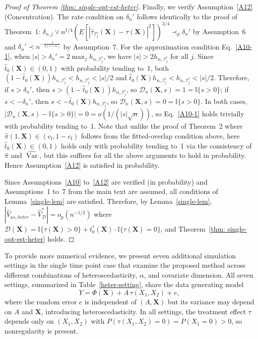 \documentclass[11pt]{article}
\theoremstyle{referenceplain}
\theoremstyle{referencedefinition}
\theoremstyle{referenceremark}
\begin{document}
\begin{proof}[Proof of Theorem \ref{thm: single-opt-est-heter}]
    Finally, we verify Assumption~\ref{A12} 
    (Concentration). The rate condition on $\delta_n'$ 
    follows identically to the proof of Theorem~1: 
    ${\delta_{n,j}}\lor n^{1/4}(E[|\widehat{\tau}_{{\mathcal{I}_j^c}}
    (\mathbf{X})-\tau(\mathbf{X})|^2])^{3/4}
    \prec_p\delta_n'$ by Assumption~6 and 
    $\delta_n'\prec n^{-\frac{1}{2(1+\alpha)}}$ by 
    Assumption~7. For the approximation condition 
    Eq.~\eqref{A10-1}, when 
    $|s|>\delta_n'=2\max_j h_{n,\mathcal{I}_j^c}$, 
    we have $|s|>2h_{n,\mathcal{I}_j^c}$ for all $j$. 
    Since $\widehat{t}_0(\mathbf{X})\in(0,1)$ with 
    probability tending to~1, both 
    $(1-\widehat{t}_0(\mathbf{X}))
    h_{n,\mathcal{I}_j^c}
    <h_{n,\mathcal{I}_j^c}<|s|/2$ and 
    $\widehat{t}_0(\mathbf{X})
    h_{n,\mathcal{I}_j^c}
    <h_{n,\mathcal{I}_j^c}<|s|/2$. Therefore, if 
    $s>\delta_n'$, then 
    $s>(1-\widehat{t}_0(\mathbf{X}))
    h_{n,\mathcal{I}_j^c}$, so 
    $\mathcal{D}_n(\mathbf{X},s)=1
    =\mathbb{I}\{s>0\}$; if $s<-\delta_n'$, then 
    $s<-\widehat{t}_0(\mathbf{X})
    h_{n,\mathcal{I}_j^c}$, so 
    $\mathcal{D}_n(\mathbf{X},s)=0
    =\mathbb{I}\{s>0\}$. In both cases, 
    $|\mathcal{D}_n(\mathbf{X},s)
    -\mathbb{I}\{s>0\}|=0=o(1/({|s|}\sqrt{n}))$, 
    so Eq.~\eqref{A10-1} holds trivially with 
    probability tending to~1. Note that unlike the 
    proof of Theorem~2 where 
    {$\widehat{\pi}(1,\mathbf{X})\in(c_{\mathrm f},1-c_{\mathrm f})$ follows from the fitted-overlap condition above}, here 
    $\widehat{t}_0(\mathbf{X})\in(0,1)$ holds only 
    with probability tending to~1 via the consistency 
    of $\widehat{\pi}$ and 
    $\widehat{\operatorname{Var}}$, but this suffices 
    for all the above arguments to hold in probability. 
    Hence Assumption~\ref{A12} is satisfied in 
    probability.

    Since Assumptions~\ref{A10} to~\ref{A12} are 
    verified (in probability) and Assumptions~1 to~7 
    from the main text are assumed, all conditions of 
    Lemma~\ref{single-lem} are satisfied. Therefore, by 
    Lemma~\ref{single-lem}, 
    $|\widehat{V}_{as,heter}
    -\widehat{V}_{\mathcal{D}}^*|
    =o_p(n^{-1/2})$ where 
    $\mathcal{D}(\mathbf{X})
    =\mathbb{I}\{\tau(\mathbf{X})>0\}
    +t_0^*(\mathbf{X})\cdot
    \mathbb{I}\{\tau(\mathbf{X})=0\}$, and 
    Theorem~\ref{thm: single-opt-est-heter} holds.
\end{proof}
To provide more numerical evidence, we present seven additional simulation settings in the single time point case that
examine the proposed method across different combinations of
heteroscedasticity, $\alpha$, and covariate dimension. All seven settings,
summarized in Table~\ref{heter-setting}, share the data generating model
$$
Y = \Phi(\mathbf{X}) + A\,\tau(X_1, X_2) + e,
$$
where the random error $e$ is independent of $(A, \mathbf{X})$ but its
variance may depend on $A$ and $\mathbf{X}$, introducing
heteroscedasticity. In all settings, the treatment effect $\tau$ depends
only on $(X_1, X_2)$ with $P(\tau(X_1, X_2) = 0) = P(X_1 = 0) > 0$,
so nonregularity is present.
\end{document}
